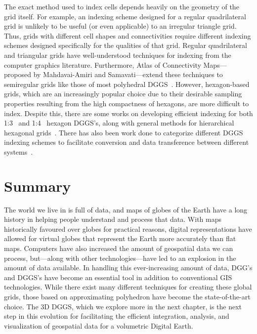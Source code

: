 The exact method used to index cells depends heavily on the geometry of the grid itself.
For example, an indexing scheme designed for a regular quadrilateral grid is unlikely to be useful (or even applicable) to an irregular triangle grid.
Thus, grids with different cell shapes and connectivities require different indexing schemes designed specifically for the qualities of that grid.
Regular quadrilateral and triangular grids have well-understood techniques for indexing from the computer graphics literature.
Furthermore, Atlas of Connectivity Maps---proposed by Mahdavai-Amiri and Samavati---extend these techniques to semiregular grids like those of most polyhedral DGGS~\cite{mahdavi2014atlas}.
However, hexagon-based grids, which are an increasingly popular choice due to their desirable sampling properties resulting from the high compactness of hexagons, are more difficult to index.
Despite this, there are some works on developing efficient indexing for both 1:3~\cite{vince2006indexing} and 1:4~\cite{tong2013efficient} hexagon DGGS's, along with general methods for hierarchical hexagonal grids~\cite{mahdavi2015hexagonal}.
There has also been work done to categorize different DGGS indexing schemes to facilitate conversion and data transference between different systems~\cite{mahdavi2015categorization}.


\section{Summary} \label{chap:2:summary}
The world we live in is full of data, and maps of globes of the Earth have a long history in helping people understand and process that data.
With maps historically favoured over globes for practical reasons, digital representations have allowed for virtual globes that represent the Earth more accurately than flat maps.
Computers have also increased the amount of geospatial data we can process, but---along with other technologies---have led to an explosion in the amount of data available.
In handling this ever-increasing amount of data, DGG's and DGGS's have become an essential tool in addition to conventional GIS technologies.
While there exist many different techniques for creating these global grids, those based on approximating polyhedron have become the state-of-the-art choice.
The 3D DGGS, which we explore more in the next chapter, is the next step in this evolution for facilitating the efficient integration, analysis, and visualization of geospatial data for a volumetric Digital Earth.
